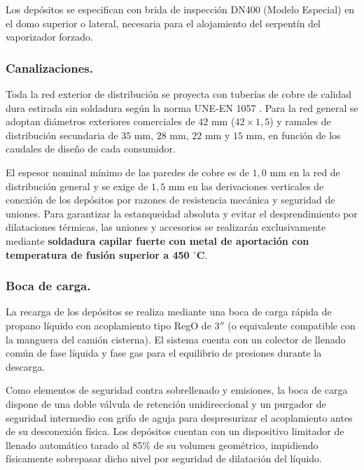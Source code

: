 \documentclass[12pt]{article}
\begin{document}
            Los depósitos se especifican con brida de inspección DN400 (Modelo Especial) en el domo superior o lateral, necesaria para el alojamiento del serpentín del vaporizador forzado.

            \subsubsection{Canalizaciones.}
            Toda la red exterior de distribución se proyecta con tuberías de cobre de calidad dura estirada sin soldadura según la norma UNE-EN 1057 \cite{une1057}. Para la red general se adoptan diámetros exteriores comerciales de $42\text{ mm}$ ($42\times 1,5$) y ramales de distribución secundaria de $35\text{ mm}$, $28\text{ mm}$, $22\text{ mm}$ y $15\text{ mm}$, en función de los caudales de diseño de cada consumidor.
            
            El espesor nominal mínimo de las paredes de cobre es de $1,0\text{ mm}$ en la red de distribución general y se exige de $1,5\text{ mm}$ en las derivaciones verticales de conexión de los depósitos por razones de resistencia mecánica y seguridad de uniones. Para garantizar la estanqueidad absoluta y evitar el desprendimiento por dilataciones térmicas, las uniones y accesorios se realizarán exclusivamente mediante \textbf{soldadura capilar fuerte con metal de aportación con temperatura de fusión superior a 450 $^{\circ}$C}.

            \subsubsection{Boca de carga.}
            La recarga de los depósitos se realiza mediante una boca de carga rápida de propano líquido con acoplamiento tipo RegO de $3''$ (o equivalente compatible con la manguera del camión cisterna). El sistema cuenta con un colector de llenado común de fase líquida y fase gas para el equilibrio de presiones durante la descarga.
            
            Como elementos de seguridad contra sobrellenado y emisiones, la boca de carga dispone de una doble válvula de retención unidireccional y un purgador de seguridad intermedio con grifo de aguja para despresurizar el acoplamiento antes de su desconexión física. Los depósitos cuentan con un dispositivo limitador de llenado automático tarado al 85\% de su volumen geométrico, impidiendo físicamente sobrepasar dicho nivel por seguridad de dilatación del líquido.
\end{document}
